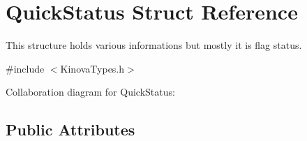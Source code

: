 \hypertarget{struct_quick_status}{}\section{Quick\+Status Struct Reference}
\label{struct_quick_status}


This structure holds various informations but mostly it is flag status.  




{\ttfamily \#include $<$Kinova\+Types.\+h$>$}



Collaboration diagram for Quick\+Status\+:
\subsection*{Public Attributes}
